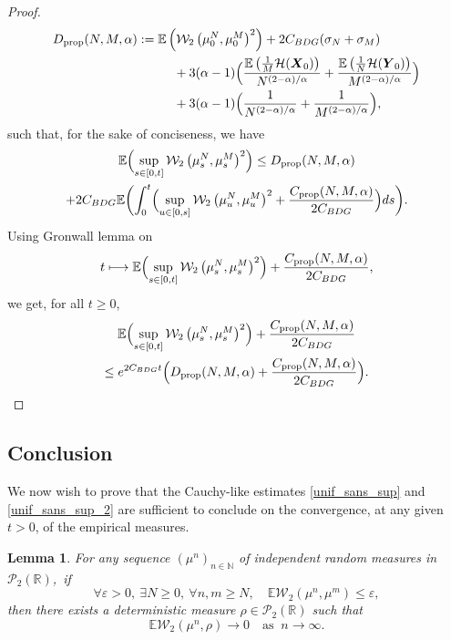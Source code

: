 \documentclass[10pt]{amsart}
\newcommand\mto{\mathchoice{\longmapsto}{\mapsto}{\mapsto}{\mapsto}}
\let\epsilon\varepsilon
\newcommand{\bX}{{\boldsymbol{X}}}
\newcommand{\bY}{{\boldsymbol{Y}}}
\theoremstyle{plain}
\newtheorem{lemma}{Lemma}[section]
\theoremstyle{definition}
\begin{document}
\begin{proof}
\begin{align*}
D_{\text{prop}}(N,M,\alpha)&:=\mathbb{E}\left(\mathcal{W}_2\left(\mu_0^N,\mu_0^M\right)^2\right)+2C_{BDG}(\sigma_N+\sigma_M)\\
&\hspace*{1cm}+3(\alpha-1)\Bigl(\frac{\mathbb{E}\left(\frac{1}{M}\mathcal{H}(\bX_0)\right)}{N^{(2-\alpha)/\alpha}}+\frac{\mathbb{E}\left(\frac{1}{N}\mathcal{H}(\bY_0)\right)}{M^{(2-\alpha)/\alpha}}\Bigr)\\
&\hspace*{1cm}+3(\alpha-1)\Bigl(\frac{1}{N^{(2-\alpha)/\alpha}}+\frac{1}{M^{(2-\alpha)/\alpha}}\Bigr),
\end{align*}
such that, for the sake of conciseness, we have
\begin{multline*}
\mathbb{E}\Bigl(\sup_{s\in[0,t]}\mathcal{W}_2\left(\mu_s^N,\mu_s^M\right)^2\Bigr)\leq D_{\text{prop}}(N,M,\alpha)\\
+2C_{BDG}\mathbb{E}\biggl(\int_0^t\Bigl(\sup_{u\in[0,s]}\mathcal{W}_2\left(\mu_u^N,\mu_u^M\right)^2+\frac{C_{\text{prop}}(N,M,\alpha)}{2C_{BDG}}\Bigr)ds\biggr).
\end{multline*}
Using Gronwall lemma on
\[
t\mto\mathbb{E}\Bigl(\sup_{s\in[0,t]}\mathcal{W}_2\left(\mu_s^N,\mu_s^M\right)^2\Bigr)+\frac{C_{\text{prop}}(N,M,\alpha)}{2C_{BDG}},
\]
we get, for all $t\geq0$,
\begin{multline*}
\mathbb{E}\Bigl(\sup_{s\in[0,t]}\mathcal{W}_2\left(\mu_s^N,\mu_s^M\right)^2\Bigr)+\frac{C_{\text{prop}}(N,M,\alpha)}{2C_{BDG}}\\
\leq e^{2C_{BDG}t}\Bigl(D_{\text{prop}}(N,M,\alpha)+\frac{C_{\text{prop}}(N,M,\alpha)}{2C_{BDG}}\Bigr).\qedhere
\end{multline*}
\end{proof}

\subsection{Conclusion}

We now wish to prove that the Cauchy-like estimates \eqref{unif_sans_sup} and \eqref{unif_sans_sup_2} are sufficient to conclude on the convergence, at any given $t>0$, of the empirical measures.

\begin{lemma}\label{conv_a_t_fixe}
For any sequence $(\mu^n)_{n\in\mathbb{N}}$ of independent random measures in $\mathcal{P}_2\left(\mathbb{R}\right)$,~if
\begin{equation}\label{Cauchy_seq_point}
\forall \epsilon>0,\ \exists N\geq0,\ \forall n,m\geq N,\quad \mathbb{E}\mathcal{W}_2\left(\mu^n,\mu^m\right)\leq\epsilon,
\end{equation}
then there exists a deterministic measure $\rho\in\mathcal{P}_2\left(\mathbb{R}\right)$ such that
\[
\mathbb{E}\mathcal{W}_2\left(\mu^n,\rho\right)\to 0\quad\text{as }\ n\to\infty.
\]
\end{lemma}
\end{document}
